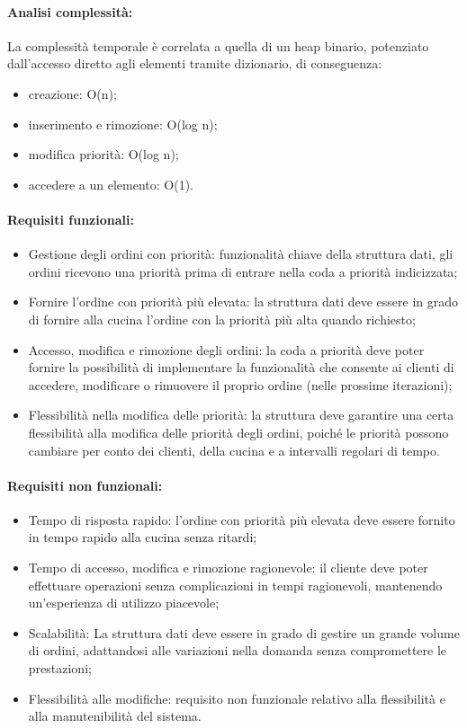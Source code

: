 \paragraph{Analisi complessità:}
La complessità temporale è correlata a quella di un heap binario, potenziato dall’accesso diretto agli elementi tramite dizionario, di conseguenza:
\begin{itemize}
	\item creazione: O(n);
	\item inserimento e rimozione: O(log n);
	\item modifica priorità: O(log n);
	\item accedere a un elemento: O(1).
\end{itemize}

\paragraph{Requisiti funzionali:}
\begin{itemize}
	\item Gestione degli ordini con priorità: funzionalità chiave della struttura dati, gli ordini ricevono una priorità prima di entrare nella coda a priorità indicizzata;
	\item Fornire l'ordine con priorità più elevata: la struttura dati deve essere in grado di fornire alla cucina l'ordine con la priorità più alta quando richiesto;
	\item Accesso, modifica e rimozione degli ordini: la coda a priorità deve poter fornire la possibilità di implementare la funzionalità che consente ai clienti di accedere, modificare o rimuovere il proprio ordine (nelle prossime iterazioni);
	\item Flessibilità nella modifica delle priorità: la struttura deve garantire una certa flessibilità alla modifica delle priorità degli ordini, poiché le priorità possono cambiare per conto dei clienti, della cucina e a intervalli regolari di tempo.
\end{itemize}

\paragraph{Requisiti non funzionali:}
\begin{itemize}
	\item Tempo di risposta rapido: l’ordine con priorità più elevata deve essere fornito in tempo rapido alla cucina senza ritardi;
	\item Tempo di accesso, modifica e rimozione ragionevole: il cliente deve poter effettuare operazioni senza complicazioni in tempi ragionevoli, mantenendo un’esperienza di utilizzo piacevole;
	\item Scalabilità: La struttura dati deve essere in grado di gestire un grande volume di ordini, adattandosi alle variazioni nella domanda senza compromettere le prestazioni;
	\item Flessibilità alle modifiche: requisito non funzionale relativo alla flessibilità e alla manutenibilità del sistema.
\end{itemize}

